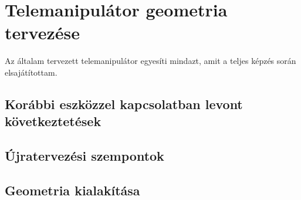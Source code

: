 \chapter{Telemanipulátor geometria tervezése}
\label{sec:LatexTools}

Az általam tervezett telemanipulátor egyesíti mindazt, amit a teljes képzés során elsajátítottam. 

\section{Korábbi eszközzel kapcsolatban levont következtetések}
\section{Újratervezési szempontok}
\section{Geometria kialakítása}
